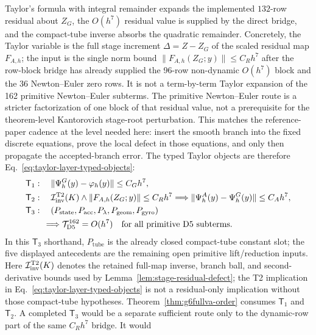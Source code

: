 \documentclass[preprint,12pt]{elsarticle}
\begin{document}
Taylor's formula with integral remainder expands the implemented \(132\)-row
residual about \(Z_G\), the \(O(h^7)\) residual value is supplied by the
direct bridge, and the compact-tube inverse absorbs the quadratic remainder.
Concretely, the Taylor variable is the full stage increment
\(\Delta=Z-Z_G\) of the scaled residual map \(F_{A,h}\); the input is the
single norm bound \(\|F_{A,h}(Z_G;y)\|\le C_Rh^7\) after the row-block bridge
has already supplied the 96-row non-dynamic \(O(h^7)\) block and the 36
Newton--Euler zero rows.  It is not a term-by-term Taylor expansion of the
162 primitive Newton--Euler subterms.
The primitive Newton--Euler route is a stricter factorization of one block of
that residual value, not a prerequisite for the theorem-level Kantorovich
stage-root perturbation.  This matches the reference-paper cadence at the
level needed here: insert the smooth branch into the fixed discrete equations,
prove the local defect in those equations, and only then propagate the
accepted-branch error.
The typed Taylor objects are therefore Eq.~\eqref{eq:taylor-layer-typed-objects}:
\begin{equation}
\label{eq:taylor-layer-typed-objects}
\begin{aligned}
\mathsf T_1&:\quad
  \|\Psi_h^G(y)-\varphi_h(y)\|\le C_Gh^7,\\
\mathsf T_2&:\quad
  \mathcal I^{\mathrm{T2}}_{\rm inv}(K)\wedge
  \|F_{A,h}(Z_G;y)\|\le C_Rh^7
  \Longrightarrow
  \|\Psi_h^A(y)-\Psi_h^G(y)\|\le C_Ah^7,\\
\mathsf T_3&:\quad
  (P_{\mathrm{state}},P_{\mathrm{acc}},P_{\lambda},
  P_{\mathrm{geom}},P_{\mathrm{gyro}})\\
&\quad\Longrightarrow
  \mathcal T_{\mathrm{D5}}^{162}=O(h^7)
  \quad\hbox{for all primitive D5 subterms}.
\end{aligned}
\end{equation}
In this \(\mathsf T_3\) shorthand, \(P_{\mathrm{tube}}\) is the already
closed compact-tube constant slot; the five displayed antecedents are the
remaining open primitive lift/reduction inputs.
Here \(\mathcal I^{\mathrm{T2}}_{\rm inv}(K)\) denotes the retained full-map
inverse, branch ball, and second-derivative bounds used by
Lemma~\ref{lem:stage-residual-defect}; the T2 implication in
Eq.~\eqref{eq:taylor-layer-typed-objects} is not a
residual-only implication without those compact-tube hypotheses.
Theorem~\ref{thm:g6fullva-order} consumes \(\mathsf T_1\) and
\(\mathsf T_2\).  A completed \(\mathsf T_3\) would be a separate sufficient
route only to the dynamic-row part of the same \(C_Rh^7\) bridge.  It would
\end{document}

